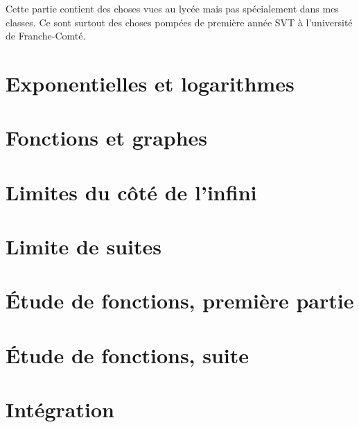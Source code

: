 
Cette partie contient des choses vues au lycée mais pas spécialement dans mes classes. Ce sont surtout des choses pompées de première année SVT à l'université de Franche-Comté.





\section{Exponentielles et logarithmes}

\section{Fonctions et graphes}


\section{Limites du côté de l'infini}

\section{Limite de suites}


\section{Étude de fonctions, première partie}

\section{Étude de fonctions, suite}

\section{Intégration}

